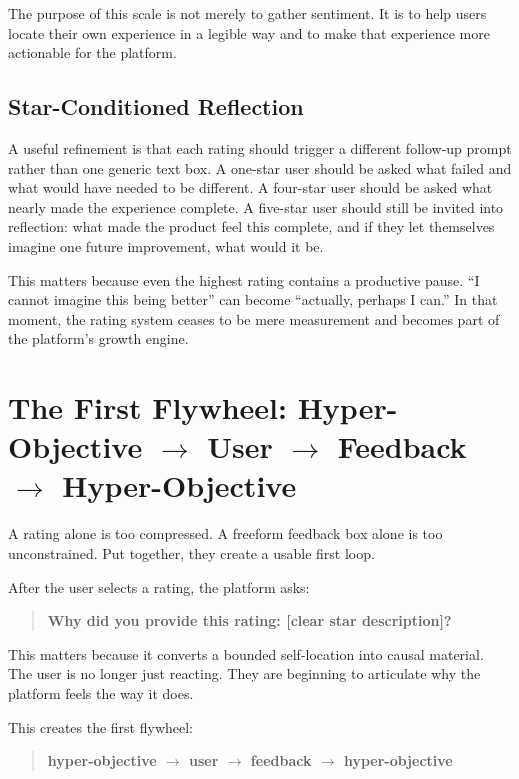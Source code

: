 \documentclass[11pt]{article}
\begin{document}
The purpose of this scale is not merely to gather sentiment. It is to help users locate their own experience in a legible way and to make that experience more actionable for the platform.

\subsection{Star-Conditioned Reflection}

A useful refinement is that each rating should trigger a different follow-up prompt rather than one generic text box. A one-star user should be asked what failed and what would have needed to be different. A four-star user should be asked what nearly made the experience complete. A five-star user should still be invited into reflection: what made the product feel this complete, and if they let themselves imagine one future improvement, what would it be.

This matters because even the highest rating contains a productive pause. ``I cannot imagine this being better'' can become ``actually, perhaps I can.'' In that moment, the rating system ceases to be mere measurement and becomes part of the platform's growth engine.

\section{The First Flywheel: Hyper-Objective \texorpdfstring{$\rightarrow$}{->} User \texorpdfstring{$\rightarrow$}{->} Feedback \texorpdfstring{$\rightarrow$}{->} Hyper-Objective}

A rating alone is too compressed. A freeform feedback box alone is too unconstrained. Put together, they create a usable first loop.

After the user selects a rating, the platform asks:

\begin{quote}
\textbf{Why did you provide this rating: [clear star description]?}
\end{quote}

This matters because it converts a bounded self-location into causal material. The user is no longer just reacting. They are beginning to articulate why the platform feels the way it does.

This creates the first flywheel:

\begin{quote}
\textbf{hyper-objective $\rightarrow$ user $\rightarrow$ feedback $\rightarrow$ hyper-objective}
\end{quote}
\end{document}
